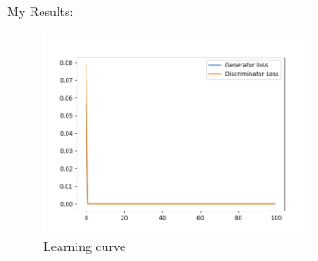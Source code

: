 \documentclass[a4paper]{article}
\theoremstyle{definition}
\newenvironment{soln}{
	\leavevmode\color{blue}\ignorespaces
}{}
\begin{document}
\begin{enumerate} [label=(\alph*)]
		\begin{soln}
        My Results:
        \begin{figure}[H]
			\centering
			\includegraphics[width=0.7\textwidth]{images/q1b_loss.png}
			\caption{Learning curve}
			\label{fig:gan_q1_loss}
		\end{figure}
		

\end{soln}
\end{enumerate}
\end{document}
